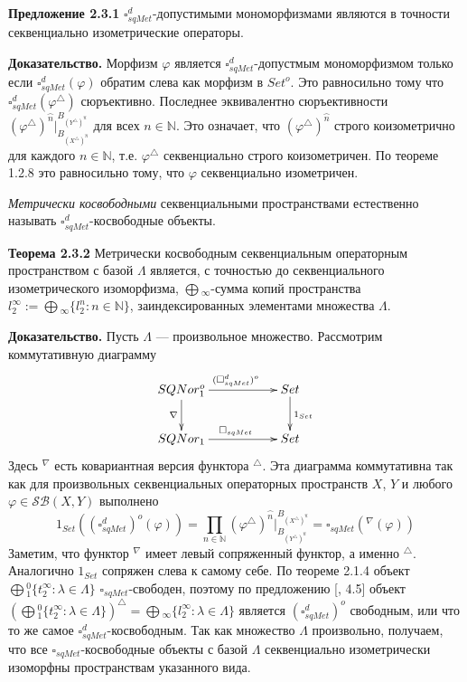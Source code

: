 \documentclass[12pt]{article}
\begin{document}
{\bf Предложение 2.3.1} $\square_{sqMet}^d$-допустимыми мономорфизмами являются в точности секвенциально  изометрические операторы.

{\bf Доказательство.}  Морфизм $\varphi$ является $\square_{sqMet}^d$-допустмым мономорфизмом только если $\square_{sqMet}^d(\varphi)$ обратим слева как морфизм в $Set^o$. Это равносильно тому что 
$\square_{sqMet}^d(\varphi^\triangle)$ сюръективно. Последнее эквивалентно  сюръективности $(\varphi^\triangle)^{\wideparen{n}}|_{B_{(X^\triangle)^{\wideparen{n}}}}^{B_{(Y^\triangle)^{\wideparen{n}}}}$ 
для всех $n\in\mathbb{N}$. Это означает, что $(\varphi^\triangle)^{\wideparen{n}}$ строго коизометрично для каждого $n\in\mathbb{N}$, т.е. $\varphi^\triangle$ секвенциально строго коизометричен. 
По теореме 1.2.8 это равносильно тому, что $\varphi$ секвенциально изометричен.

\medskip

\textit{Метрически косвободными} секвенциальными пространствами естественно называть $\square_{sqMet}^d$-косвободные объекты.

\medskip

{\bf Теорема 2.3.2} Метрически косвободным секвенциальным операторным пространством с базой $\Lambda$ является, с точностью до секвенциального изометрического изоморфизма, 
$\bigoplus{}_\infty$-сумма копий пространства $l_2^\infty:=\bigoplus{}_\infty\{l_2^n:n\in\mathbb{N}\}$, заиндексированных элементами множества $\Lambda$.

{\bf Доказательство.}  Пусть $\Lambda$ --- произвольное множество. Рассмотрим коммутативную диаграмму
$$
\xymatrix{
SQNor_1^o \ar[d]_{\nabla } \ar[rr]^{(\square_{sqMet}^{d})^o} & & {Set}\ar[d]^{1_{Set}}\\
SQNor_1\ar[rr]^{\square_{sqMet}}&  &{Set}}
$$
Здесь ${}^\nabla$ есть ковариантная версия функтора ${}^\triangle$.
Эта диаграмма коммутативна так как для произвольных секвенциальных операторных пространств $X$, $Y$ и любого $\varphi\in\mathcal{SB}(X,Y)$ выполнено
$$
1_{Set}((\square_{sqMet}^d)^o(\varphi))
=\prod\limits_{n\in\mathbb{N}} (\varphi^\triangle )^{\wideparen{n}}|_{B_{(Y^\triangle )^{\wideparen{n}}}}^{B_{(X^\triangle )^{\wideparen{n}}}}
=\square_{sqMet}({}^\nabla(\varphi))
$$
Заметим, что функтор ${}^\nabla$ имеет левый сопряженный функтор, а именно ${}^\triangle$. Аналогично $1_{Set}$ сопряжен слева к самому себе. 
По теореме 2.1.4 объект $\bigoplus{}_1^0\{t_2^\infty:\lambda\in\Lambda\}$ $\square_{sqMet}$-свободен, поэтому по предложению [\cite{HelMetrFrQmod}, 4.5] объект 
$(\bigoplus{}_1^0\{t_2^\infty:\lambda\in\Lambda\})^\triangle=\bigoplus{}_\infty\{l_2^\infty:\lambda\in\Lambda\}$ является $(\square_{sqMet}^d)^o$ свободным, или что то же самое $\square_{sqMet}^d$-косвободным. 
Так как множество $\Lambda$ произвольно, получаем, что все $\square_{sqMet}$-косвободные объекты с базой 
$\Lambda$ секвенциально изометрически изоморфны пространствам указанного вида.
\end{document}
